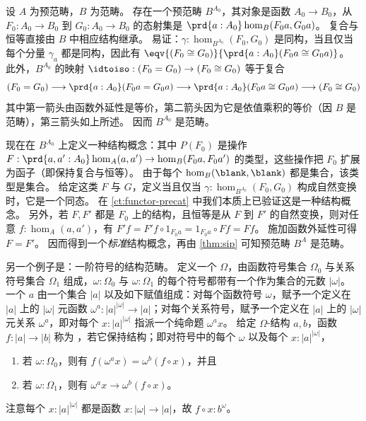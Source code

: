 \begin{eg}\label{ct:sip-functor-cat}
  设 $A$ 为预范畴，$B$ 为范畴。
  存在一个预范畴 $B^{A_0}$，其对象是函数 $A_0 \to B_0$，从 $F_0:A_0 \to B_0$ 到 $G_0:A_0 \to B_0$ 的态射集是 $\prd{a:A_0} \hom_B(F_0 a, G_0 a)$。
  复合与恒等直接由 $B$ 中相应结构继承。
  易证：$\gamma:\hom_{B^{A_0}}(F_0, G_0)$ 是同构，当且仅当每个分量 $\gamma_a$ 都是同构，因此有 $\eqv{(F_0 \cong G_0)}{\prd{a:A_0} (F_0 a \cong G_0 a)}$。
  此外，$B^{A_0}$ 的映射 $\idtoiso : (F_0 = G_0) \to (F_0 \cong G_0)$ 等于复合
  \[ (F_0 = G_0) \longrightarrow \prd{a:A_0} (F_0 a  = G_0 a) \longrightarrow \prd{a:A_0} (F_0 a \cong G_0 a) \longrightarrow (F_0 \cong G_0) \]
  其中第一箭头由函数外延性是等价，第二箭头因为它是依值乘积的等价（因 $B$ 是范畴），第三箭头如上所述。
  因而 $B^{A_0}$ 是范畴。

  现在在 $B^{A_0}$ 上定义一种结构概念：其中 $P(F_0)$ 是操作 $F:\prd{a,a':A_0} \hom_A(a,a') \to \hom_B(F_0 a,F_0 a')$ 的类型，这些操作把 $F_0$ 扩展为函子（即保持复合与恒等）。
  由于每个 $\hom_B(\blank,\blank)$ 都是集合，该类型是集合。
  给定这类 $F$ 与 $G$，定义当且仅当 $\gamma:\hom_{B^{A_0}}(F_0, G_0)$ 构成自然变换时，它是一个同态。
  在 \cref{ct:functor-precat} 中我们本质上已验证这是一种结构概念。
  另外，若 $F,F'$ 都是 $F_0$ 上的结构，且恒等是从 $F$ 到 $F'$ 的自然变换，则对任意 $f:\hom_A(a,a')$，有
  $F'f = F'f \circ 1_{F_0 a} = 1_{F_0 a}\circ F f = F f$。
  施加函数外延性可得 $F = F'$。
  因而得到一个\emph{标准}结构概念，再由 \cref{thm:sip} 可知预范畴 $B^A$ 是范畴。
\end{eg}

另一个例子是：一阶符号的结构范畴。
定义一个
%
%
$\Omega$，由函数符号集合 $\Omega_0$ 与关系符号集合 $\Omega_1$ 组成，$\omega:\Omega_0$ 与 $\omega:\Omega_1$ 的每个符号都带有一个作为集合的元数 $|\omega|$。
一个
%
%
$a$ 由一个集合 $|a|$ 以及如下赋值组成：对每个函数符号 $\omega$，赋予一个定义在 $|a|$ 上的 $|\omega|$ 元函数 $\omega^a:|a|^{|\omega|}\to |a|$；对每个关系符号，赋予一个定义在 $|a|$ 上的 $|\omega|$ 元关系 $\omega^a$，即对每个 $x:|a|^{|\omega|}$ 指派一个纯命题 $\omega^ax$。
给定 $\Omega$-结构 $a,b$，函数 $f:|a|\to |b|$ 称为
%
%
，若它保持结构；即对符号中的每个 $\omega$ 以及每个 $x:|a|^{|\omega|}$，
\begin{enumerate}
\item 若 $\omega:\Omega_0$，则有 $f(\omega^ax) = \omega^b(f\circ x)$，并且
\item 若 $\omega:\Omega_1$，则有 $\omega^ax\to\omega^b(f\circ x)$。
\end{enumerate}
注意每个 $x:|a|^{|\omega|}$ 都是函数 $x:|\omega|\to |a|$，故 $f\circ x : b^\omega$。

